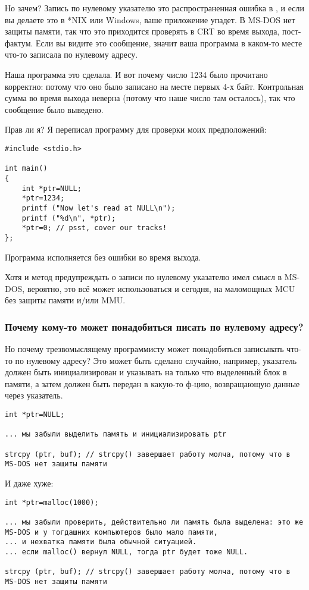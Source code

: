 Но зачем? Запись по нулевому указателю это распространенная ошибка в \CCpp, и если вы делаете это в *NIX или Windows,
ваше приложение упадет.
В MS-DOS нет защиты памяти, так что это приходится проверять в \ac{CRT} во время выхода, пост-фактум.
Если вы видите это сообщение, значит ваша программа в каком-то месте что-то записала по нулевому адресу.

Наша программа это сделала. И вот почему число 1234 было прочитано корректно: потому что оно было записано на месте
первых 4-х байт.
Контрольная сумма во время выхода неверна (потому что наше число там осталось), так что сообщение было выведено.

Прав ли я?
Я переписал программу для проверки моих предположений:

\begin{lstlisting}[style=customc]
#include <stdio.h>

int main()
{
	int *ptr=NULL;
	*ptr=1234;
	printf ("Now let's read at NULL\n");
	printf ("%d\n", *ptr);
	*ptr=0; // psst, cover our tracks!
};
\end{lstlisting}

Программа исполняется без ошибки во время выхода.

Хотя и метод предупреждать о записи по нулевому указателю имел смысл в MS-DOS,
вероятно, это всё может использоваться и сегодня, на маломощных \ac{MCU} без защиты памяти и/или \ac{MMU}.

\subsubsection{Почему кому-то может понадобиться писать по нулевому адресу?}

Но почему трезвомыслящему программисту может понадобиться записывать что-то по нулевому адресу?
Это может быть сделано случайно, например, указатель должен быть инициализирован и указывать на только что выделенный
блок в памяти, а затем должен быть передан в какую-то ф-цию, возвращающую данные через указатель.

\begin{lstlisting}[style=customc]
int *ptr=NULL;

... мы забыли выделить память и инициализировать ptr

strcpy (ptr, buf); // strcpy() завершает работу молча, потому что в MS-DOS нет защиты памяти
\end{lstlisting}

И даже хуже:

\begin{lstlisting}[style=customc]
int *ptr=malloc(1000);

... мы забыли проверить, действительно ли память была выделена: это же MS-DOS и у тогдашних компьютеров было мало памяти,
... и нехватка памяти была обычной ситуацией.
... если malloc() вернул NULL, тогда ptr будет тоже NULL.

strcpy (ptr, buf); // strcpy() завершает работу молча, потому что в MS-DOS нет защиты памяти
\end{lstlisting}

